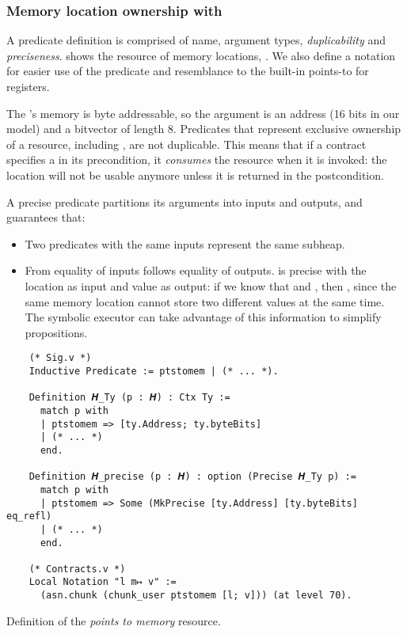 \subsubsection{Memory location ownership with }

A predicate definition is comprised of name, argument types, \emph{duplicability} and \emph{preciseness}.  shows the resource of memory locations, . We also define a notation  for easier use of the predicate and resemblance to the built-in points-to for registers.

The \msp's memory is byte addressable, so the argument  is an address (16 bits in our model) and  a bitvector of length 8. Predicates that represent exclusive ownership of a resource, including , are not duplicable. This means that if a contract specifies a  in its precondition, it \emph{consumes} the resource when it is invoked: the location will not be usable anymore unless it is returned in the postcondition.

A precise predicate partitions its arguments into inputs and outputs, and guarantees that:
\begin{itemize}
\item Two predicates with the same inputs represent the same subheap.
\item From equality of inputs follows equality of outputs.  is precise with the location as input and value as output: if we know that  and , then , since the same memory location cannot store two different values at the same time. The symbolic executor can take advantage of this information to simplify propositions.
\end{itemize}

\begin{listing}[htb]
  \begin{verbatim}
    (* Sig.v *)
    Inductive Predicate := ptstomem | (* ... *).

    Definition 𝑯_Ty (p : 𝑯) : Ctx Ty :=
      match p with
      | ptstomem => [ty.Address; ty.byteBits]
      | (* ... *)
      end.

    Definition 𝑯_precise (p : 𝑯) : option (Precise 𝑯_Ty p) :=
      match p with
      | ptstomem => Some (MkPrecise [ty.Address] [ty.byteBits] eq_refl)
      | (* ... *)
      end.

    (* Contracts.v *)
    Local Notation "l m↦ v" :=
      (asn.chunk (chunk_user ptstomem [l; v])) (at level 70).
  \end{verbatim}
  \caption{Definition of the \emph{points to memory} resource.}
  \label{lst:ptstomem}
\end{listing}

